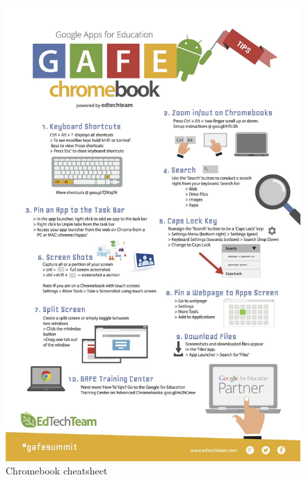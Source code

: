 \documentclass[]{book}
\begin{document}
\begin{figure}
\centering
\includegraphics{./images/00_chromebook_cheatsheet.jpeg}
\caption{Chromebook cheatsheet}
\end{figure}
\end{document}
